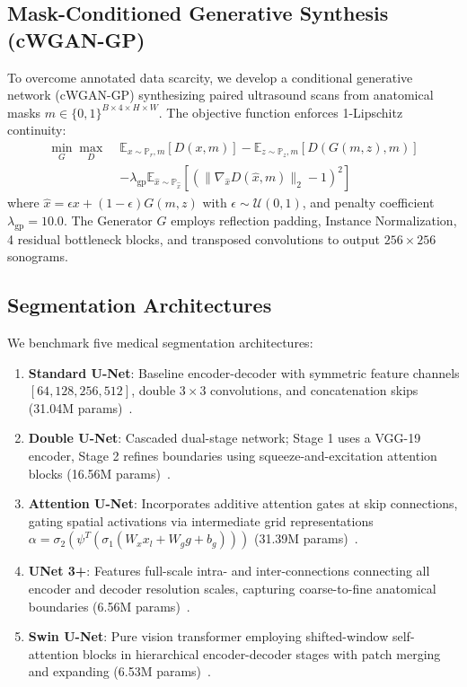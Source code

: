 \documentclass[conference]{IEEEtran}
\begin{document}
\subsection{Mask-Conditioned Generative Synthesis (cWGAN-GP)}
To overcome annotated data scarcity, we develop a conditional generative network (cWGAN-GP) synthesizing paired ultrasound scans from anatomical masks $m \in \{0, 1\}^{B \times 4 \times H \times W}$. The objective function enforces 1-Lipschitz continuity:
\begin{equation}
\begin{aligned}
    \min_G \max_D \; &\mathbb{E}_{x \sim \mathbb{P}_r, m}\left[D(x, m)\right] - \mathbb{E}_{z \sim \mathbb{P}_z, m}\left[D(G(m, z), m)\right] \\
    &- \lambda_{\text{gp}} \mathbb{E}_{\hat{x} \sim \mathbb{P}_{\hat{x}}}\left[\left(\|\nabla_{\hat{x}} D(\hat{x}, m)\|_2 - 1\right)^2\right]
\end{aligned}
\end{equation}
where $\hat{x} = \epsilon x + (1 - \epsilon) G(m, z)$ with $\epsilon \sim \mathcal{U}(0, 1)$, and penalty coefficient $\lambda_{\text{gp}} = 10.0$. The Generator $G$ employs reflection padding, Instance Normalization, 4 residual bottleneck blocks, and transposed convolutions to output $256 \times 256$ sonograms.

\subsection{Segmentation Architectures}
We benchmark five medical segmentation architectures:
\begin{enumerate}
    \item \textbf{Standard U-Net}: Baseline encoder-decoder with symmetric feature channels $[64, 128, 256, 512]$, double $3 \times 3$ convolutions, and concatenation skips (31.04M params)~\cite{ronneberger2015u}.
    \item \textbf{Double U-Net}: Cascaded dual-stage network; Stage 1 uses a VGG-19 encoder, Stage 2 refines boundaries using squeeze-and-excitation attention blocks (16.56M params)~\cite{jha2020doubleu}.
    \item \textbf{Attention U-Net}: Incorporates additive attention gates at skip connections, gating spatial activations via intermediate grid representations $\alpha = \sigma_2(\psi^T(\sigma_1(W_x x_l + W_g g + b_g)))$ (31.39M params)~\cite{oktay2018attention}.
    \item \textbf{UNet 3+}: Features full-scale intra- and inter-connections connecting all encoder and decoder resolution scales, capturing coarse-to-fine anatomical boundaries (6.56M params)~\cite{huang2020unet3plus}.
    \item \textbf{Swin U-Net}: Pure vision transformer employing shifted-window self-attention blocks in hierarchical encoder-decoder stages with patch merging and expanding (6.53M params)~\cite{cao2022swin}.
\end{enumerate}
\end{document}
